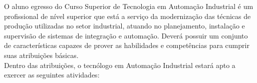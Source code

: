 
O aluno egresso do Curso Superior de Tecnologia em Automação Industrial é um profissional de nível superior que está a serviço da modernização das técnicas de produção utilizadas no setor industrial, atuando no planejamento, instalação e supervisão de sistemas de integração e automação. Deverá possuir um conjunto de características capazes de prover as habilidades e competências para cumprir suas atribuições básicas.\\

Dentro das atribuições, o tecnólogo em Automação Industrial estará apto a exercer as seguintes atividades:

